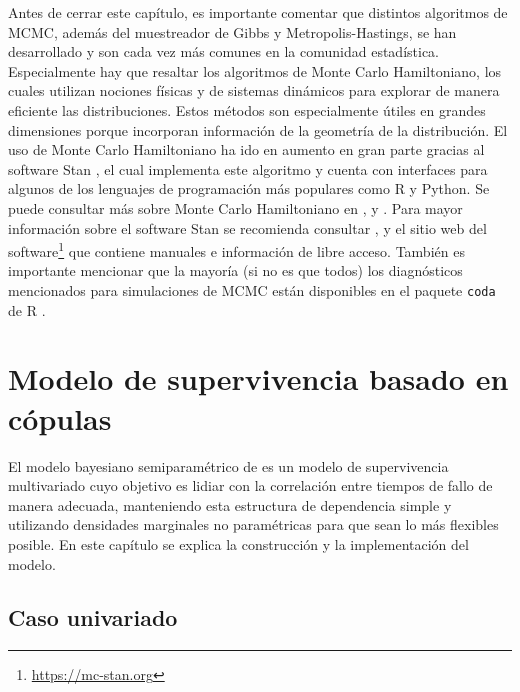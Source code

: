 \documentclass[11pt,a4paper]{article}
\begin{document}
Antes de cerrar este capítulo, es importante comentar que distintos algoritmos de MCMC, además del muestreador de Gibbs y Metropolis-Hastings, se han desarrollado y son cada vez más comunes en la comunidad estadística. Especialmente hay que resaltar los algoritmos de Monte Carlo Hamiltoniano, los cuales utilizan nociones físicas y de sistemas dinámicos para explorar de manera eficiente las distribuciones. Estos métodos son especialmente útiles en grandes dimensiones porque incorporan información de la geometría de la distribución. El uso de Monte Carlo Hamiltoniano ha ido en aumento en gran parte gracias al software Stan \citep{stan}, el cual implementa este algoritmo y cuenta con interfaces para algunos de los lenguajes de programación más populares como R y Python. Se puede consultar más sobre Monte Carlo Hamiltoniano en \citet{neal}, \citet{betancourt} y \citet{gelman}. Para mayor información sobre el software Stan se recomienda consultar \citet{gelman}, \citet{kruschke} y el sitio web del software\footnote{ \url{https://mc-stan.org}} que contiene manuales e información de libre acceso. También es importante mencionar 
que la mayoría (si no es que todos) los diagnósticos mencionados para simulaciones de MCMC están disponibles en el paquete \texttt{coda} de R \citep{coda}.

\newpage

\section{Modelo de supervivencia basado en cópulas}
\label{elmodelo}

El modelo bayesiano semiparamétrico de \citet{nieto} es un modelo de supervivencia multivariado cuyo objetivo es lidiar con la correlación entre tiempos de fallo de manera adecuada, manteniendo esta estructura de dependencia simple y utilizando densidades marginales no paramétricas para que sean lo más flexibles posible. En este capítulo se explica la construcción y la implementación del modelo.

\subsection{Caso univariado}
\end{document}
